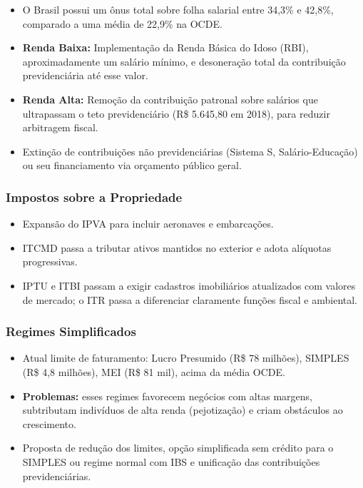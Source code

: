 \documentclass[a4paper,12pt]{article}[abntex2]
\begin{document}
\begin{itemize}
  \item O Brasil possui um ônus total sobre folha salarial entre 34,3\% e 42,8\%, comparado a uma média de 22,9\% na OCDE.
  \item \textbf{Renda Baixa:} Implementação da Renda Básica do Idoso (RBI), aproximadamente um salário mínimo, e desoneração total da contribuição previdenciária até esse valor.
  \item \textbf{Renda Alta:} Remoção da contribuição patronal sobre salários que ultrapassam o teto previdenciário (R\$ 5.645,80 em 2018), para reduzir arbitragem fiscal.
  \item Extinção de contribuições não previdenciárias (Sistema S, Salário-Educação) ou seu financiamento via orçamento público geral.
\end{itemize}

\subsubsection{\textbf{Impostos sobre a Propriedade}}

\begin{itemize}
  \item Expansão do IPVA para incluir aeronaves e embarcações.
  \item ITCMD passa a tributar ativos mantidos no exterior e adota alíquotas progressivas.
  \item IPTU e ITBI passam a exigir cadastros imobiliários atualizados com valores de mercado; o ITR passa a diferenciar claramente funções fiscal e ambiental.
\end{itemize}

\subsubsection{\textbf{Regimes Simplificados}}

\begin{itemize}
  \item Atual limite de faturamento: Lucro Presumido (R\$ 78 milhões), SIMPLES (R\$ 4,8 milhões), MEI (R\$ 81 mil), acima da média OCDE.
  \item \textbf{Problemas:} esses regimes favorecem negócios com altas margens, subtributam indivíduos de alta renda (pejotização) e criam obstáculos ao crescimento.
  \item Proposta de redução dos limites, opção simplificada sem crédito para o SIMPLES ou regime normal com IBS e unificação das contribuições previdenciárias.
\end{itemize}
\end{document}
